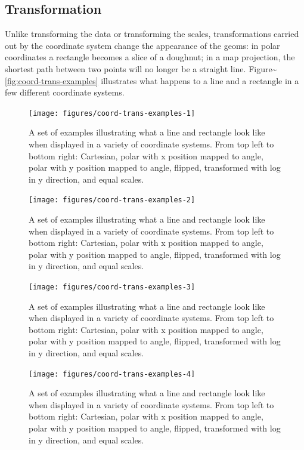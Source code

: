 \subsection{Transformation}\label{sub:coord-transformation}

Unlike transforming the data or transforming the scales, transformations
carried out by the coordinate system change the appearance of the geoms:
in polar coordinates a rectangle becomes a slice of a doughnut; in a map
projection, the shortest path between two points will no longer be a
straight line. Figure\textasciitilde{}\ref{fig:coord-trans-examples}
illustrates what happens to a line and a rectangle in a few different
coordinate systems. 

\begin{figure}
\texttt{[image: figures/coord-trans-examples-1]} \caption{A set of examples illustrating what a line and rectangle look like when displayed in a variety of coordinate systems.  From top left to bottom right: Cartesian, polar with x position mapped to angle, polar with y position mapped to angle, flipped, transformed with log in y direction, and equal scales.\label{fig:coord-trans-examples1}}
\end{figure}\begin{figure}
\texttt{[image: figures/coord-trans-examples-2]} \caption{A set of examples illustrating what a line and rectangle look like when displayed in a variety of coordinate systems.  From top left to bottom right: Cartesian, polar with x position mapped to angle, polar with y position mapped to angle, flipped, transformed with log in y direction, and equal scales.\label{fig:coord-trans-examples2}}
\end{figure}\begin{figure}
\texttt{[image: figures/coord-trans-examples-3]} \caption{A set of examples illustrating what a line and rectangle look like when displayed in a variety of coordinate systems.  From top left to bottom right: Cartesian, polar with x position mapped to angle, polar with y position mapped to angle, flipped, transformed with log in y direction, and equal scales.\label{fig:coord-trans-examples3}}
\end{figure}\begin{figure}
\texttt{[image: figures/coord-trans-examples-4]} \caption{A set of examples illustrating what a line and rectangle look like when displayed in a variety of coordinate systems.  From top left to bottom right: Cartesian, polar with x position mapped to angle, polar with y position mapped to angle, flipped, transformed with log in y direction, and equal scales.\label{fig:coord-trans-examples4}}

\end{figure}
